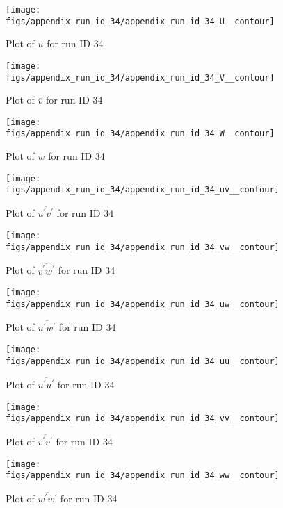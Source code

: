 \begin{figure}[H]
\centering
\texttt{[image: figs/appendix\_run\_id\_34/appendix\_run\_id\_34\_U\_\_contour]}
\caption{Plot of $\overline{u}$ for run ID 34}
\label{fig:appendix_run_id_34_U__contour}
\end{figure}


\begin{figure}[H]
\centering
\texttt{[image: figs/appendix\_run\_id\_34/appendix\_run\_id\_34\_V\_\_contour]}
\caption{Plot of $\overline{v}$ for run ID 34}
\label{fig:appendix_run_id_34_V__contour}
\end{figure}


\begin{figure}[H]
\centering
\texttt{[image: figs/appendix\_run\_id\_34/appendix\_run\_id\_34\_W\_\_contour]}
\caption{Plot of $\overline{w}$ for run ID 34}
\label{fig:appendix_run_id_34_W__contour}
\end{figure}


\begin{figure}[H]
\centering
\texttt{[image: figs/appendix\_run\_id\_34/appendix\_run\_id\_34\_uv\_\_contour]}
\caption{Plot of $\overline{u^\prime v^\prime}$ for run ID 34}
\label{fig:appendix_run_id_34_uv__contour}
\end{figure}


\begin{figure}[H]
\centering
\texttt{[image: figs/appendix\_run\_id\_34/appendix\_run\_id\_34\_vw\_\_contour]}
\caption{Plot of $\overline{v^\prime w^\prime}$ for run ID 34}
\label{fig:appendix_run_id_34_vw__contour}
\end{figure}


\begin{figure}[H]
\centering
\texttt{[image: figs/appendix\_run\_id\_34/appendix\_run\_id\_34\_uw\_\_contour]}
\caption{Plot of $\overline{u^\prime w^\prime}$ for run ID 34}
\label{fig:appendix_run_id_34_uw__contour}
\end{figure}


\begin{figure}[H]
\centering
\texttt{[image: figs/appendix\_run\_id\_34/appendix\_run\_id\_34\_uu\_\_contour]}
\caption{Plot of $\overline{u^\prime u^\prime}$ for run ID 34}
\label{fig:appendix_run_id_34_uu__contour}
\end{figure}


\begin{figure}[H]
\centering
\texttt{[image: figs/appendix\_run\_id\_34/appendix\_run\_id\_34\_vv\_\_contour]}
\caption{Plot of $\overline{v^\prime v^\prime}$ for run ID 34}
\label{fig:appendix_run_id_34_vv__contour}
\end{figure}


\begin{figure}[H]
\centering
\texttt{[image: figs/appendix\_run\_id\_34/appendix\_run\_id\_34\_ww\_\_contour]}
\caption{Plot of $\overline{w^\prime w^\prime}$ for run ID 34}
\label{fig:appendix_run_id_34_ww__contour}
\end{figure}


